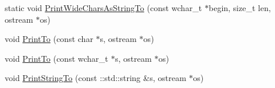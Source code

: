 \begin{DoxyCompactItemize}
\item 
static void \hyperlink{namespacetesting_1_1internal_a60bad79058a982c131958131851db58e}{\-Print\-Wide\-Chars\-As\-String\-To} (const wchar\-\_\-t $\ast$begin, size\-\_\-t len, ostream $\ast$os)
\item 
void \hyperlink{namespacetesting_1_1internal_af161ef56e52a196ae8cacddaf757c2c2}{\-Print\-To} (const char $\ast$s, ostream $\ast$os)
\item 
void \hyperlink{namespacetesting_1_1internal_a1cde7bde221aa8b4437d83e74edcf386}{\-Print\-To} (const wchar\-\_\-t $\ast$s, ostream $\ast$os)
\item 
void \hyperlink{namespacetesting_1_1internal_acc8f9f38c881dc01d2ed18b0c6bf3197}{\-Print\-String\-To} (const \-::std\-::string \&s, ostream $\ast$os)
\end{DoxyCompactItemize}

